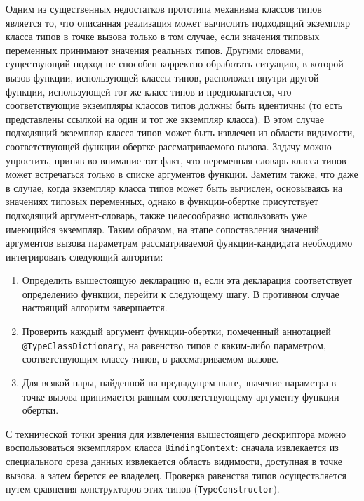Одним из существенных недостатков прототипа механизма классов типов является то, что описанная реализация может вычислить подходящий экземпляр класса типов в точке вызова только в том случае, если значения типовых переменных принимают значения реальных типов. Другими словами, существующий подход не способен корректно обработать ситуацию, в которой вызов функции, использующей классы типов, расположен внутри другой функции, использующей тот же класс типов и предполагается, что соответствующие экземпляры классов типов должны быть идентичны (то есть представлены ссылкой на один и тот же экземпляр класса). В этом случае подходящий экземпляр класса типов может быть извлечен из области видимости, соответствующей функции-обертке рассматриваемого вызова. Задачу можно упростить, приняв во внимание тот факт, что переменная-словарь класса типов может встречаться только в списке аргументов функции. Заметим также, что даже в случае, когда экземпляр класса типов может быть вычислен, основываясь на значениях типовых переменных, однако в функции-обертке присутствует подходящий аргумент-словарь, также целесообразно использовать уже имеющийся экземпляр. Таким образом, на этапе сопоставления значений аргументов вызова параметрам рассматриваемой функции-кандидата необходимо интегрировать следующий алгоритм:
\begin{enumerate}
    \item Определить вышестоящую декларацию и, если эта декларация соответствует определению функции, перейти к следующему шагу. В противном случае настоящий алгоритм завершается.
    \item Проверить каждый аргумент функции-обертки, помеченный аннотацией \lstinline{@TypeClassDictionary}, на равенство типов с каким-либо параметром, соответствующим классу типов, в рассматриваемом вызове.
    \item Для всякой пары, найденной на предыдущем шаге, значение параметра в точке вызова принимается равным соответствующему аргументу функции-обертки.
\end{enumerate} 
С технической точки зрения для извлечения вышестоящего дескриптора можно воспользоваться экземпляром класса \lstinline{BindingContext}: сначала извлекается из специального среза данных извлекается область видимости, доступная в точке вызова, а затем берется ее владелец. Проверка равенства типов осуществляется путем сравнения конструкторов этих типов (\lstinline{TypeConstructor}).  